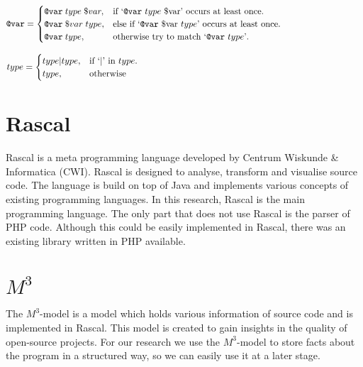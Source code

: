 \documentclass[../main.tex]{subfiles}
\begin{document}
\begin{equation}
  \begin{aligned}
  \texttt{@var}=\begin{cases}
    \texttt{@var} \; type \; \$var, & \text{if `\texttt{@var} $type$ \$var' occurs at least once}.\\
    \texttt{@var} \; \$var \; type, & \text{else if `\texttt{@var} \$var $type$' occurs at least once}.\\
    \texttt{@var} \; type, & \text{otherwise try to match `\texttt{@var} $type$'}.\\
  \end{cases}
  \end{aligned}
  \phantom{\hspace{3.2cm}} %
\end{equation}

\begin{equation}
  \begin{aligned}
  type=\begin{cases}
    type|type, & \text{if `$\vert$' in $type$}.\\
    type, & \text{otherwise}
  \end{cases}
  \end{aligned}
  \phantom{\hspace{8.8cm}} %
\end{equation}
 
    \section{Rascal}\label{sec:background_rascal}
    \Gls{Rascal}\cite{Kli:09} is a meta programming language developed by Centrum Wiskunde \& Informatica (CWI).
    Rascal is designed to analyse, transform and visualise source code.
    The language is build on top of Java and implements various concepts of existing programming languages.
    In this research, Rascal is the main programming language.
    The only part that does not use Rascal is the parser of PHP code.
    Although this could be easily implemented in Rascal, there was an existing library written in PHP available.

    \section{$M^3$}\label{sec:background_m3}
    The $M^3$-model\cite{Ana:13} is a model which holds various information of source code and is implemented in Rascal.
    This model is created to gain insights in the quality of open-source projects.
    For our research we use the $M^3$-model to store facts about the program in a structured way, so we can easily use it at a later stage.
    
\end{document}
